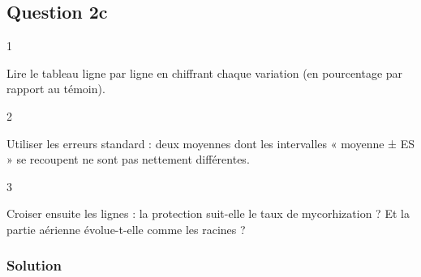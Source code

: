 \documentclass[11pt,a4paper]{article}
\begin{document}
\hypertarget{question-2c}{%
\subsection{Question 2c}\label{question-2c}}

\begin{indication}{1}

Lire le tableau ligne par ligne en chiffrant chaque variation (en pourcentage par rapport au témoin).

\end{indication}

\begin{indication}{2}

Utiliser les erreurs standard : deux moyennes dont les intervalles « moyenne ± ES » se recoupent ne sont pas nettement différentes.

\end{indication}

\begin{indication}{3}

Croiser ensuite les lignes : la protection suit-elle le taux de mycorhization ? Et la partie aérienne évolue-t-elle comme les racines ?

\end{indication}

\hypertarget{solution-5}{%
\subsubsection{Solution}\label{solution-5}}
\end{document}
